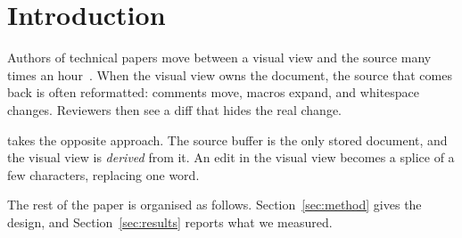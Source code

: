 \section{Introduction}
\label{sec:intro}

Authors of technical papers move between a visual view and the source many times
an hour~\cite{knuth1984}. When the visual view owns the document, the source that
comes back is often reformatted: comments move, macros expand, and whitespace
changes. %
Reviewers then see a diff that hides the real change.

\sys takes the opposite approach. The source buffer is the only stored document,
and the visual view is \emph{derived} from it. An edit in the visual view becomes
a splice of a few characters, \eg replacing one word.


The rest of the paper is organised as follows. Section~\ref{sec:method} gives the
design, and Section~\ref{sec:results} reports what we measured.
